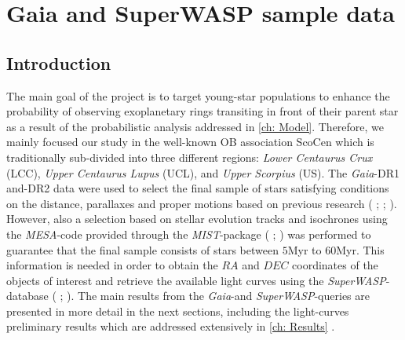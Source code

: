 \chapter{\textbf{Gaia and SuperWASP sample data}} \label{ch: Data}
\vspace{0.5cm} 

\section{Introduction}

The main goal of the project is to target young-star populations to enhance the probability of observing exoplanetary rings transiting in front of their parent star as a result of the probabilistic analysis addressed in \autoref{ch: Model}. Therefore, we mainly focused our study in the well-known OB association ScoCen which is traditionally sub-divided into three different regions: \textit{Lower Centaurus Crux} (LCC), \textit{Upper Centaurus Lupus} (UCL), and \textit{Upper Scorpius} (US). The \textit{Gaia}-DR1 and-DR2 data were used to select the final sample of stars satisfying conditions on the distance, parallaxes and proper motions based on previous research ( \citeyear{2018MNRAS.tmp..210W};  \citeyear{2016MNRAS.461..794P};  \citeyear{1989A&A...216...44D}). However, also a selection based on stellar evolution tracks and isochrones using the \textit{MESA}-code provided through the \textit{MIST}-package ( \citeyear{2016ApJS..222....8D};  \citeyear{2016ApJ...823..102C}) was performed to guarantee that the final sample consists of stars between $5$Myr to $60$Myr. This information is needed in order to obtain the $RA$ and $DEC$ coordinates of the objects of interest and retrieve the available light curves using the \textit{SuperWASP}-database ( \citeyear{2006PASP..118.1407P};  \citeyear{2010A&A...520L..10B}). The main results from the \textit{Gaia}-and \textit{SuperWASP}-queries are presented in more detail in the next sections, including the light-curves preliminary results which are addressed extensively in \autoref{ch: Results} .   

